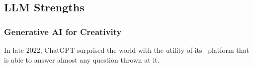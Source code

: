 \subsection{LLM Strengths}
\subsubsection{Generative AI for Creativity}

In late 2022, ChatGPT surprised the world with the utility of its \gai\ platform that is able to answer almost any question thrown at it.

